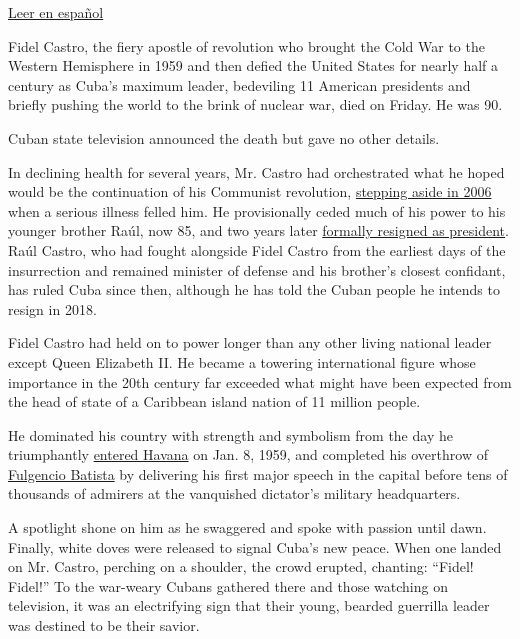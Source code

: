 \href{http://www.nytimes3xbfgragh.onion/es/2016/11/26/fidel-castro-lider-de-la-revolucion-cubana-y-simbolo-de-la-izquierda-muere-a-los-90-anos/}{Leer
en español}

Fidel Castro, the fiery apostle of revolution who brought the Cold War
to the Western Hemisphere in 1959 and then defied the United States for
nearly half a century as Cuba's maximum leader, bedeviling 11 American
presidents and briefly pushing the world to the brink of nuclear war,
died on Friday. He was 90.

Cuban state television announced the death but gave no other details.

In declining health for several years, Mr. Castro had orchestrated what
he hoped would be the continuation of his Communist revolution,
\href{http://www.nytimes3xbfgragh.onion/2006/08/14/world/americas/14cuba.html?_r=0}{stepping
aside in 2006} when a serious illness felled him. He provisionally ceded
much of his power to his younger brother Raúl, now 85, and two years
later
\href{http://www.nytimes3xbfgragh.onion/2008/02/20/world/americas/20cuba.html}{formally
resigned as president}. Raúl Castro, who had fought alongside Fidel
Castro from the earliest days of the insurrection and remained minister
of defense and his brother's closest confidant, has ruled Cuba since
then, although he has told the Cuban people he intends to resign in
2018.

Fidel Castro had held on to power longer than any other living national
leader except Queen Elizabeth II. He became a towering international
figure whose importance in the 20th century far exceeded what might have
been expected from the head of state of a Caribbean island nation of 11
million people.

He dominated his country with strength and symbolism from the day he
triumphantly
\href{http://timesmachine.nytimes3xbfgragh.onion/timesmachine/1959/01/09/89104354.html?action=click\&contentCollection=Archives\&module=ArticleEndCTA\&region=ArchiveBody\&pgtype=article\&pageNumber=1}{entered
Havana} on Jan. 8, 1959, and completed his overthrow of
\href{http://www.nytimes3xbfgragh.onion/1973/08/07/archives/batista-excuban-dictator-dies-in-spain-unending-exile-succession-of.html}{Fulgencio
Batista} by delivering his first major speech in the capital before tens
of thousands of admirers at the vanquished dictator's military
headquarters.

A spotlight shone on him as he swaggered and spoke with passion until
dawn. Finally, white doves were released to signal Cuba's new peace.
When one landed on Mr. Castro, perching on a shoulder, the crowd
erupted, chanting: ``Fidel! Fidel!'' To the war-weary Cubans gathered
there and those watching on television, it was an electrifying sign that
their young, bearded guerrilla leader was destined to be their savior.


